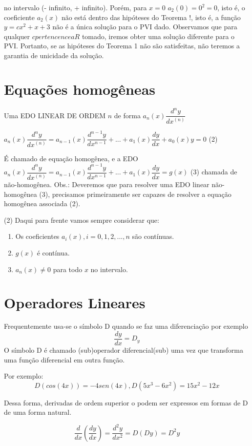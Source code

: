 \documentclass[
	article,			%
	11pt,				%
	oneside,			%
	a4paper,			%
	english,			%
	brazil,				%
	sumario=tradicional
	]{abntex2}
\begin{document}
no intervalo (- infinito, + infinito). Porém, para $x = 0$ $a_{2}(0) = 0^{2} = 0$, isto é, o coeficiente $a_{2}(x)$ não está dentro das hipóteses do Teorema !, isto é, a função $y = cx^2+x+3$ não é a única solução para o PVI dado. Observamos que para qualquer $c pertencence a R$ tomado, iremos obter uma solução diferente para o PVI. Portanto, se as hipóteses do Teorema 1 não são satisfeitas, não teremos a garantia de unicidade da solução.

\section{Equações homogêneas}
Uma EDO LINEAR DE ORDEM $n$ de forma $a_n(x)\dfrac{d^ny}{dx^(n)}$

$a_n(x)\dfrac{d^ny}{dx^(n)}=a_{n-1}(x)\dfrac{d^{n-1}y}{dx^{n-1}}+...+a_1(x)\dfrac{dy}{dx}+a_0(x)y=0$ (2)

É chamado de equação homogênea, e a EDO
$a_n(x)\dfrac{d^ny}{dx^(n)}=a_{n-1}(x)\dfrac{d^{n-1}y}{dx^{n-1}}+...+a_1(x)\dfrac{dy}{dx}=g(x)$ (3)
chamada de não-homogênea.
Obs.: Deveremos que para resolver uma EDO linear não-homogênea (3), precisamos primeiramente ser capazes de resolver a equação homogênea associada (2).

(2) Daqui para frente vamos sempre considerar que:
\begin{enumerate}
	\item Os coeficientes $a_i(x), i=0,1,2,...,n$ são contínuas.
	\item $g(x)$ é contínua.
	\item $a_n(x) \neq 0$ para todo $x$ no intervalo.
\end{enumerate}

\section{Operadores Lineares}
Frequentemente usa-se o símbolo D quando se faz uma diferenciação por exemplo $$\dfrac{dy}{dx}=D_y$$ O símbolo D é chamado (sub)operador diferencial(sub) uma vez que transforma uma função diferencial em outra função.

Por exemplo: $$D(cos(4x))=-4sen(4x), D(5x^3-6x^2)=15x^2-12x$$

Dessa forma, derivadas de ordem superior o podem ser expressos em formas de D de uma forma natural.

$$\dfrac{d}{dx}(\dfrac{dy}{dx})=\dfrac{d^2y}{dx^2}=D(Dy)=D^2y$$
\end{document}
